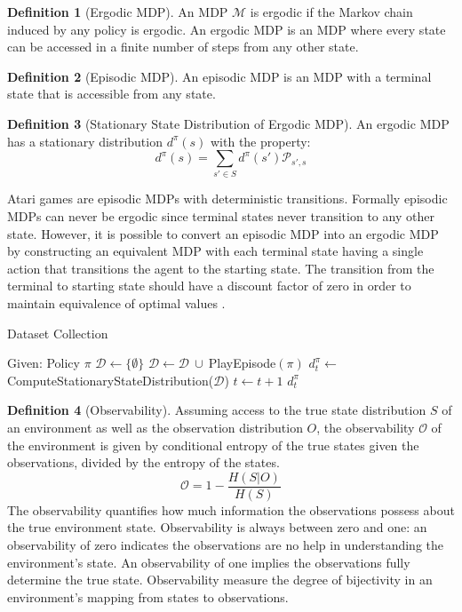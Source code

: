 \documentclass{article} %
\theoremstyle{definition}
\newtheorem{definition}{Definition}[section]
\begin{document}
\begin{definition}[Ergodic MDP]
An MDP $\mathcal{M}$ is ergodic if the Markov chain induced by any
policy is ergodic. An ergodic MDP is an MDP where every state can be
accessed in a finite number of steps from any other state.
\end{definition}

\begin{definition}[Episodic MDP]
An episodic MDP is an MDP with a terminal state that is accessible
from any state.
\end{definition}

\begin{definition}[Stationary State Distribution of Ergodic MDP]
An ergodic MDP has a stationary distribution $d^{\pi}(s)$ with the property:
\[
d^\pi(s) = \sum_{s' \in S} d^\pi(s')\mathcal{P}_{s',s}
\]
\end{definition}

Atari games are episodic MDPs with deterministic transitions. Formally
episodic MDPs can never be ergodic since terminal states never
transition to any other state. However, it is possible to convert an
episodic MDP into an ergodic MDP by constructing an equivalent MDP
with each terminal state having a single action that transitions the
agent to the starting state. The transition from the terminal to
starting state should have a discount factor of zero in order to
maintain equivalence of optimal values \cite{VanHasselt11}.

\begin{algorithm}
\caption{Dataset Collection}
\label{ram-ent}
\begin{algorithmic}
\State Given: Policy $\pi$
\State $\mathcal{D} \gets \{\emptyset\}$ 
\Do
\State $\mathcal{D} \gets \mathcal{D}\ \cup \ $PlayEpisode$(\pi)$
\State $d^\pi_t \gets \ $ComputeStationaryStateDistribution($\mathcal{D}$)
\State $t\gets t+1$
 
\State \Return $d^\pi_t$
\end{algorithmic}
\end{algorithm}

\begin{definition}[Observability]
Assuming access to the true state distribution $S$ of an environment
as well as the observation distribution $O$, the observability
$\mathcal{O}$ of the environment is given by conditional entropy of
the true states given the observations, divided by the entropy of the
states.
\[
\mathcal{O} = 1 - \frac{H(S|O)}{H(S)}
\]
The observability quantifies how much information the observations
possess about the true environment state. Observability is always
between zero and one: an observability of zero indicates the
observations are no help in understanding the environment's state. An
observability of one implies the observations fully determine the true
state. Observability measure the degree of bijectivity in an
environment's mapping from states to observations.
\end{definition}
\end{document}
